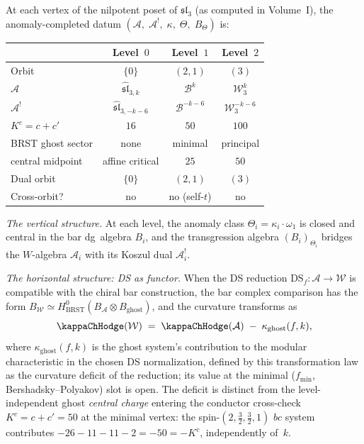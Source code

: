 \begin{construction}
\label{constr:sl3-anomaly-chain}
At each vertex of the nilpotent poset of $\mathfrak{sl}_3$
\textup{(}as computed in Volume~I\textup{)}, the
anomaly-completed datum
$(\mathcal A,\;\mathcal A^!,\;\kappa,\;\Theta,\;B_\Theta)$
is:
\begin{center}
\renewcommand{\arraystretch}{1.3}
\begin{tabular}{lccc}
& \textbf{Level~$0$} & \textbf{Level~$1$} & \textbf{Level~$2$} \\
\hline
Orbit & $\{0\}$ & $(2,1)$ & $(3)$ \\[2pt]
$\mathcal A$ &
 $\widehat{\mathfrak{sl}}_{3,k}$ &
 $\mathcal B^k$ &
 $\mathcal W_3^k$ \\[2pt]
$\mathcal A^!$ &
 $\widehat{\mathfrak{sl}}_{3,-k-6}$ &
 $\mathcal B^{-k-6}$ &
 $\mathcal W_3^{-k-6}$ \\[2pt]
$K^c=c+c'$ & $16$ & $50$ & $100$ \\[2pt]
BRST ghost sector & none & minimal & principal \\[2pt]
central midpoint & affine critical & $25$ & $50$ \\[2pt]
Dual orbit & $\{0\}$ & $(2,1)$ & $(3)$ \\[2pt]
Cross-orbit? & no & no (self-$t$) & no
\end{tabular}
\end{center}

\emph{The vertical structure.}
At each level, the anomaly class $\Theta_i=\kappa_i\cdot\omega_1$
is closed and central in the bar dg~algebra $B_i$, and the
transgression algebra $(B_i)_{\Theta_i}$ bridges the
$W$-algebra $\mathcal A_i$ with its Koszul dual
$\mathcal A_i^!$.

\emph{The horizontal structure: DS as functor.}
When the DS reduction $\mathrm{DS}_f\colon\mathcal A\to\mathcal W$
is compatible with the chiral bar construction, the bar complex
comparison has the form
$B_{\mathcal W}\simeq H^0_{\mathrm{BRST}}(B_{\mathcal A}
\otimes B_{\mathrm{ghost}})$,
and the curvature transforms as
\begin{equation}\label{eq:curvature-ds-transform}
\kappaChHodge(\mathcal W)
\;=\;
\kappaChHodge(\mathcal A)
\;-\;
\kappa_{\mathrm{ghost}}(f,k),
\end{equation}
where $\kappa_{\mathrm{ghost}}(f,k)$ is the ghost system's
contribution to the modular characteristic in the chosen DS
normalization, defined by this transformation law as the curvature
deficit of the reduction; its value at the minimal
($f_{\min}$, Bershadsky--Polyakov) slot is open. The deficit is
distinct from the level-independent ghost \emph{central charge}
entering the conductor cross-check $K^c = c + c' = 50$ at the
minimal vertex: the spin-$(2, \tfrac32, \tfrac32, 1)$ $bc$ system
contributes $-26 - 11 - 11 - 2 = -50 = -K^c$, independently
of~$k$.


\end{construction}
